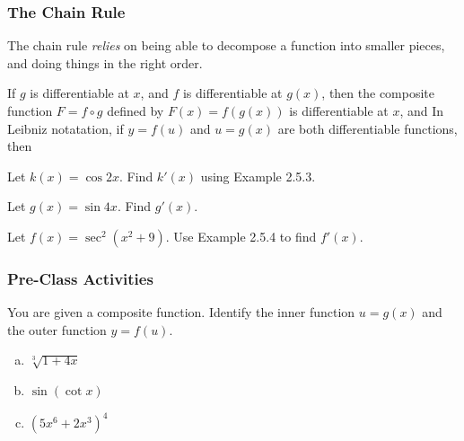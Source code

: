 \documentclass[notes]{subfiles}
\begin{document}
	\subsubsection*{The Chain Rule}
		The chain rule \emph{relies} on being able to decompose a function into smaller pieces, and doing things in the right order.  
		\begin{thm}
			If $g$ is differentiable at $x$, and $f$ is differentiable at $g(x)$, then the composite function $F = f\circ g$ defined by $F(x) = f(g(x))$ is differentiable at $x$, and 
			In Leibniz notatation, if $y = f(u)$ and $u = g(x)$ are both differentiable functions, then
		\end{thm}
			\newpage

		\begin{ex}
			Let $k(x) = \cos 2x$.  Find $k'(x)$ using Example 2.5.3.
		\end{ex}
		
		\begin{ex}
			Let $g(x) = \sin 4x$.  Find $g'(x)$.
		\end{ex}
		\begin{ex}
			Let $f(x) = \sec^2(x^2+9)$.  Use Example 2.5.4 to find $f'(x)$.
		\end{ex}
			\newpage
	
	\subsubsection*{Pre-Class Activities}
		\begin{ex}
			You are given a composite function.  Identify the inner function $u = g(x)$ and the outer function $y = f(u)$.
			\begin{enumerate}[(a)]
				\item $ \sqrt[3]{1+4x}$
					
				\item $\sin (\cot x)$
					
				\item $(5x^6 + 2x^3)^4$
			\end{enumerate}
		\end{ex}
		
\end{document}
